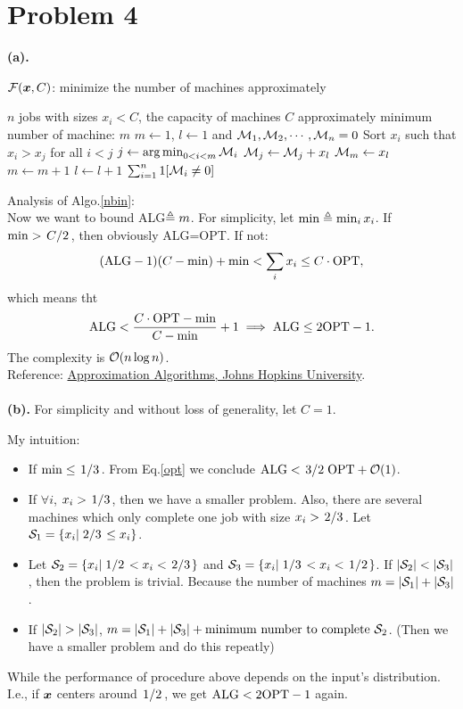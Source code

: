 \documentclass{article}
\begin{document}
\section*{Problem 4}
\textbf{(a).}
\begin{algorithm}[htbp]
	\caption{$\+F(\*x,C)$: minimize the number of machines approximately}
	\label{nbin}
	\begin{algorithmic}[1]
		\renewcommand{\algorithmicrequire}{\textbf{Input:}}
		\renewcommand{\algorithmicensure}{\textbf{Output:}}
		\renewcommand{\algorithmiccomment}[1]{\hfill\textit{\textcolor{blue}{\##1}}}
		\REQUIRE $n$ jobs with sizes $x_i<C$, the capacity of machines  $C$
		\ENSURE  approximately minimum number of machine: $m$
		\STATE $m\gets 1$, $l\gets 1$ and $\+M_1,\+M_2,\cdots,\+M_n=0$
		\STATE Sort $x_i$ such that  $x_i>x_j$ for all  $i<j$
		\STATE $j\gets \argmin_{0<i<m}\+M_i$
		\STATE $\+M_j\gets \+M_j+x_l$
		\ELSE
			\STATE $\+M_m\gets x_l$
			\STATE $m\gets m+1$
		\ENDIF
		\STATE $l\gets l+1$
		\ENDWHILE
		\RETURN $\sum_{i=1}^n1[\+M_i\ne0]$
	\end{algorithmic} 
\end{algorithm}
Analysis of Algo.\ref{nbin}:\\[6pt]
Now we want to bound ALG$\defeq m$. For simplicity, let $\min\defeq\min_ix_i$.
If $\min>\flatfrac{C}{2}$, then obviously ALG=OPT. If not:
\[
	(\-{ALG}-1)(C-\min)+\min<\sum_ix_i\le C\cdot\-{OPT}
,\] which means tht
\begin{equation}
	\-{ALG}<\frac{C\cdot\-{OPT}-\min}{C-\min}+1
	\implies
	\-{ALG}\le 2\-{OPT}-1.
	\label{opt}
\end{equation}
The complexity is $\+O(n\log n)$.
\\[5pt]
Reference: \href{https://www.cs.jhu.edu/~mdinitz/classes/ApproxAlgorithms/Spring2015/notes/lec8.pdf}{Approximation Algorithms, Johns Hopkins University}.
\\\\
\textbf{(b).} For simplicity and without loss of generality, let $C=1$.
 
My intuition:
\begin{itemize}
	\item If $\min\le \flatfrac{1}{3}$. From Eq.\ref{opt} we conclude $\rm{ALG}<\flatfrac{3}{2}\rm{OPT}+\+O(1)$.
	\item If $\forall i$, $x_i>\flatfrac{1}{3}$, then we have a smaller problem. Also, there are several machines which only complete one job with size $x_i>\flatfrac{2}{3}$. Let $\+S_1=\{x_i|\flatfrac{2}{3}\le x_i\}$.
	\item Let $\+S_2=\{x_i|\flatfrac{1}{2}<x_i<\flatfrac{2}{3}\}$ and $\+S_3=\{x_i|\flatfrac{1}{3}<x_i<\flatfrac{1}{2}\}$. If $\abs{\+S_2}<\abs{\+S_3}$, then the problem is trivial. Because the number of machines $m=\abs{\+S_1}+\abs{\+S_3}$.
	\item If $\abs{\+S_2}>\abs{\+S_3}$, $m=\abs{\+S_1}+\abs{\+S_3}+\text{minimum number to complete $\+S_2$}$. (Then we have a smaller problem and do this repeatly)
\end{itemize}
While the performance of procedure above depends on the input's distribution. I.e., if $\*x$ centers around $\flatfrac{1}{2}$, we get $\rm{ALG}<2\rm{OPT}-1$ again.
\end{document}
